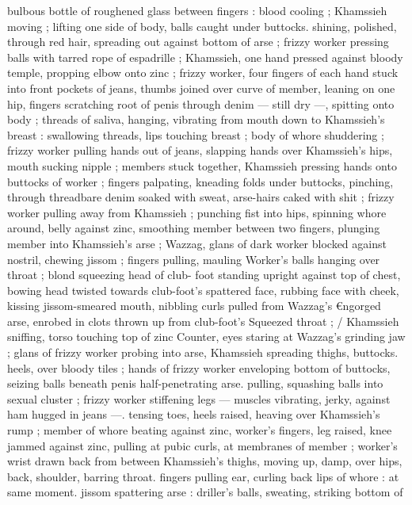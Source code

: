 {bulbous bottle of roughened glass between fingers : blood cooling ; 
Khamssieh moving ; lifting one side of body, balls caught under 
buttocks. shining, polished, through red hair, spreading out against 
bottom of arse ; frizzy worker pressing balls with tarred rope of 
espadrille ; Khamssieh, one hand pressed against bloody temple, 
propping elbow onto zinc ; frizzy worker, four fingers of each hand 
stuck into front pockets of jeans, thumbs joined over curve of 
member, leaning on one hip, fingers scratching root of penis through 
denim --- still dry ---, spitting onto body ; threads of saliva, hanging, 
vibrating from mouth down to Khamssieh's breast : swallowing 
threads, lips touching breast ; body of whore shuddering ; frizzy 
worker pulling hands out of jeans, slapping hands over Khamssieh's 
hips, mouth sucking nipple ; members stuck together, Khamssieh 
pressing hands onto buttocks of worker ; fingers palpating, kneading 
folds under buttocks, pinching, through threadbare denim soaked 
with sweat, arse-hairs caked with shit ; frizzy worker pulling away 
from Khamssieh ; punching fist into hips, spinning whore around, 
belly against zinc, smoothing member between two fingers, plunging 
member into Khamssieh's arse ; Wazzag, glans of dark worker 
blocked against nostril, chewing jissom ; fingers pulling, mauling 
Worker's balls hanging over throat ; blond squeezing head of club- 
foot standing upright against top of chest, bowing head twisted 
towards club-foot's spattered face, rubbing face with cheek, kissing 
jissom-smeared mouth, nibbling curls pulled from Wazzag's 
€ngorged arse, enrobed in clots thrown up from club-foot's 
Squeezed throat ; {\slash} Khamssieh sniffing, torso touching top of zinc 
Counter, eyes staring at Wazzag's grinding jaw ; glans of frizzy 
worker probing into arse, Khamssieh spreading thighs, buttocks. 
heels, over bloody tiles ; hands of frizzy worker enveloping bottom 
of buttocks, seizing balls beneath penis half-penetrating arse. 
pulling, squashing balls into sexual cluster ; frizzy worker stiffening 
legs --- muscles vibrating, jerky, against ham hugged in jeans ---. 
tensing toes, heels raised, heaving over Khamssieh's rump ; member 
of whore beating against zinc, worker's fingers, leg raised, knee 
jammed against zinc, pulling at pubic curls, at membranes of 
member ; worker's wrist drawn back from between Khamssieh's 
thighs, moving up, damp, over hips, back, shoulder, barring throat. 
fingers pulling ear, curling back lips of whore : at same moment. 
jissom spattering arse : driller's balls, sweating, striking bottom of 
}
